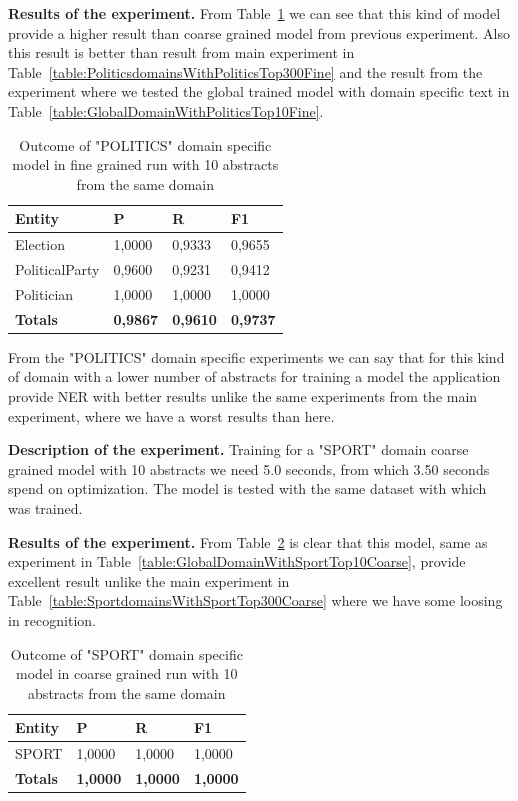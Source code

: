 \documentclass[thesis=M,english]{FITthesis}[2018/05/30]
\begin{document}
	\textbf{Results of the experiment.} From Table~\ref{table:PoliticsDomainWithPoliticsTop10Fine} we can see that this kind of model provide a higher result than coarse grained model from previous experiment. Also this result is better than result from main experiment in Table~\ref{table:PoliticsdomainsWithPoliticsTop300Fine} and the result from the experiment where we tested the global trained model with domain specific text in Table~\ref{table:GlobalDomainWithPoliticsTop10Fine}.
	
	\begin{table}[H]\centering
		\begin{tabular}{|l|l|l|l|}
			\hline {\textbf{Entity}} & {\textbf{P}} & {\textbf{R}} & {\textbf{F1}}\\\hline
				Election & 1,0000 & 0,9333 & 0,9655\\
				PoliticalParty & 0,9600 & 0,9231 & 0,9412\\
				Politician & 1,0000 & 1,0000 & 1,0000\\\hline
				\textbf{Totals} & \textbf{0,9867} & \textbf{0,9610} & \textbf{0,9737}\\\hline
		\end{tabular}
		\caption{Outcome of "POLITICS" domain specific model in fine grained run with 10 abstracts from the same domain \label{table:PoliticsDomainWithPoliticsTop10Fine}}		
	\end{table}	

	From the "POLITICS" domain specific experiments we can say that for this kind of domain with a lower number of abstracts for training a model the application provide NER with better results unlike the same experiments from the main experiment, where we have a worst results than here.
		
	
	\textbf{Description of the experiment.} Training for a "SPORT" domain coarse grained model with 10 abstracts we need 5.0 seconds, from which 3.50 seconds spend on optimization. The model is tested with the same dataset with which was trained.
	
	\textbf{Results of the experiment.} From Table~\ref{table:SportDomainWithSportTop10Coarse} is clear that this model, same as experiment in Table~\ref{table:GlobalDomainWithSportTop10Coarse}, provide excellent result unlike the main experiment in Table~\ref{table:SportdomainsWithSportTop300Coarse} where we have some loosing in recognition. 
	
	\begin{table}[H]\centering
		\begin{tabular}{|l|l|l|l|}
			\hline {\textbf{Entity}} & {\textbf{P}} & {\textbf{R}} & {\textbf{F1}}\\\hline
				SPORT & 1,0000 & 1,0000 & 1,0000\\\hline
				\textbf{Totals} & \textbf{1,0000} & \textbf{1,0000} & \textbf{1,0000}\\\hline
		\end{tabular}
		\caption{Outcome of "SPORT" domain specific model in coarse grained run with 10 abstracts from the same domain \label{table:SportDomainWithSportTop10Coarse}}
	\end{table}	
\end{document}
